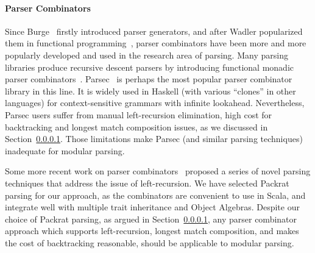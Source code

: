 
\paragraph{Parser Combinators} Since Burge~\cite{burge1975} firstly
introduced parser generators, and after Wadler popularized them 
in functional programming~\cite{Wadler1985}, parser combinators have been
more and more popularly developed and used in the research area of
parsing. Many parsing libraries produce recursive descent
parsers by introducing functional monadic
parser combinators~\cite{nott237}. Parsec~\cite{Leijen2001} is 
perhaps the most popular parser combinator library in this line. 
It is widely used in Haskell (with various ``clones'' in other languages)
for context-sensitive grammars with infinite lookahead. Nevertheless,
Parsec users suffer from manual left-recursion elimination, 
high cost for backtracking and longest match composition issues, 
as we discussed in Section~\ref{}. Those limitations make Parsec 
(and similar parsing techniques) inadequate for modular parsing.

Some more recent work on parser
combinators~\cite{Ford2002,Might2011,Frost2008} proposed a series of
novel parsing techniques that address the issue of
left-recursion. We have selected Packrat parsing for our approach, 
as the combinators are convenient to use in Scala, and 
integrate well with multiple trait inheritance and
Object Algebras. 
Despite our choice of Packrat parsing, as argued in Section~\ref{}, 
any parser combinator approach which supports left-recursion, longest 
match composition, and makes the cost of backtracking reasonable,
should be applicable to modular parsing.


